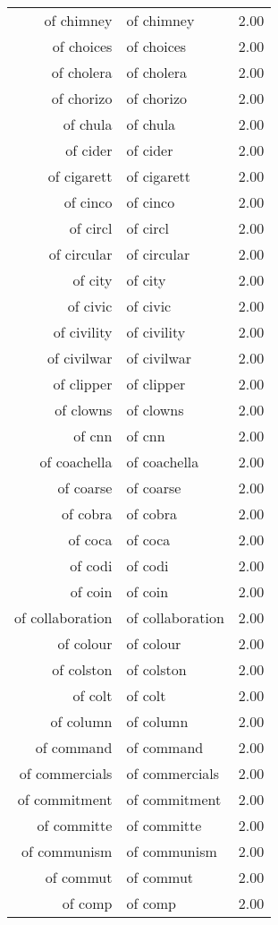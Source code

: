 \begin{table}[ht]
\begin{tabular}{rlr}
  of chimney & of chimney & 2.00 \\ 
  of choices & of choices & 2.00 \\ 
  of cholera & of cholera & 2.00 \\ 
  of chorizo & of chorizo & 2.00 \\ 
  of chula & of chula & 2.00 \\ 
  of cider & of cider & 2.00 \\ 
  of cigarett & of cigarett & 2.00 \\ 
  of cinco & of cinco & 2.00 \\ 
  of circl & of circl & 2.00 \\ 
  of circular & of circular & 2.00 \\ 
  of city & of city & 2.00 \\ 
  of civic & of civic & 2.00 \\ 
  of civility & of civility & 2.00 \\ 
  of civilwar & of civilwar & 2.00 \\ 
  of clipper & of clipper & 2.00 \\ 
  of clowns & of clowns & 2.00 \\ 
  of cnn & of cnn & 2.00 \\ 
  of coachella & of coachella & 2.00 \\ 
  of coarse & of coarse & 2.00 \\ 
  of cobra & of cobra & 2.00 \\ 
  of coca & of coca & 2.00 \\ 
  of codi & of codi & 2.00 \\ 
  of coin & of coin & 2.00 \\ 
  of collaboration & of collaboration & 2.00 \\ 
  of colour & of colour & 2.00 \\ 
  of colston & of colston & 2.00 \\ 
  of colt & of colt & 2.00 \\ 
  of column & of column & 2.00 \\ 
  of command & of command & 2.00 \\ 
  of commercials & of commercials & 2.00 \\ 
  of commitment & of commitment & 2.00 \\ 
  of committe & of committe & 2.00 \\ 
  of communism & of communism & 2.00 \\ 
  of commut & of commut & 2.00 \\ 
  of comp & of comp & 2.00 \\ 

\end{tabular}
\end{table}
